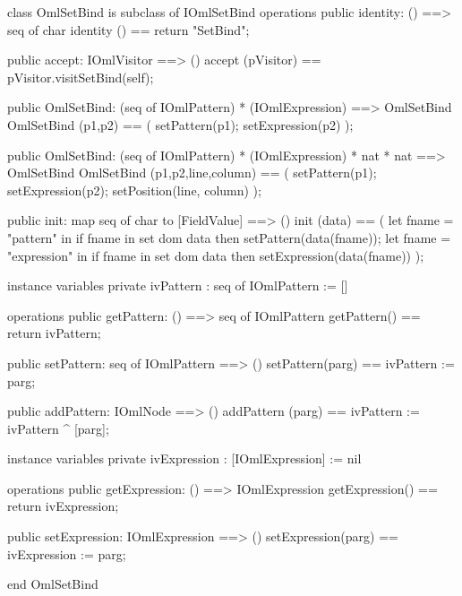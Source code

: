 \begin{vdm_al}
class OmlSetBind is subclass of IOmlSetBind
operations
  public identity: () ==> seq of char
  identity () == return "SetBind";

  public accept: IOmlVisitor ==> ()
  accept (pVisitor) == pVisitor.visitSetBind(self);

  public OmlSetBind:
    (seq of IOmlPattern) *
    (IOmlExpression) ==> OmlSetBind
  OmlSetBind (p1,p2) == 
    ( setPattern(p1);
      setExpression(p2) );

  public OmlSetBind:
    (seq of IOmlPattern) *
    (IOmlExpression) *
    nat *
    nat ==> OmlSetBind
  OmlSetBind (p1,p2,line,column) == 
    ( setPattern(p1);
      setExpression(p2);
      setPosition(line, column) );

  public init: map seq of char to [FieldValue] ==> ()
  init (data) ==
    ( let fname = "pattern" in
        if fname in set dom data
        then setPattern(data(fname));
      let fname = "expression" in
        if fname in set dom data
        then setExpression(data(fname)) );

instance variables
  private ivPattern : seq of IOmlPattern := []

operations
  public getPattern: () ==> seq of IOmlPattern
  getPattern() == return ivPattern;

  public setPattern: seq of IOmlPattern ==> ()
  setPattern(parg) == ivPattern := parg;

  public addPattern: IOmlNode ==> ()
  addPattern (parg) == ivPattern := ivPattern ^ [parg];

instance variables
  private ivExpression : [IOmlExpression] := nil

operations
  public getExpression: () ==> IOmlExpression
  getExpression() == return ivExpression;

  public setExpression: IOmlExpression ==> ()
  setExpression(parg) == ivExpression := parg;

end OmlSetBind
\end{vdm_al}

